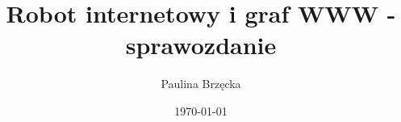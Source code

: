 \documentclass[10pt,a4paper]{report}
\begin{document}
\title{Robot internetowy i graf WWW - sprawozdanie}
\author{Paulina Brzęcka}
\date{\today}
\maketitle

\tableofcontents






\end{document}
